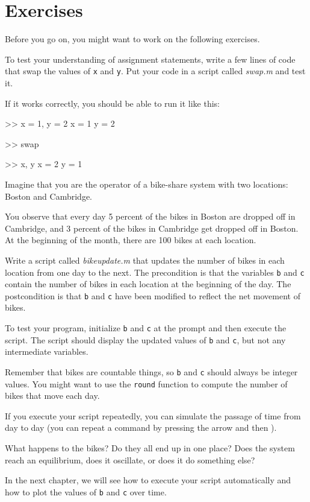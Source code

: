 \section{Exercises}

Before you go on, you might want to work on the following exercises.

\begin{ex}
To test your understanding of assignment statements, write a few lines of code that swap the values of \lstinline{x} and \lstinline{y}.
Put your code in a script called \emph{swap.m} and test it.

If it works correctly, you should be able to run it like this:

\begin{code}
>> x = 1, y = 2
x = 1
y = 2

>> swap

>> x, y
x = 2
y = 1
\end{code}
\end{ex}





\begin{ex}
\label{bikegame}

Imagine that you are the operator of a bike-share system with two
locations: Boston and Cambridge.

You observe that every day 5 percent
of the bikes in Boston are dropped off in Cambridge, and 3 percent of the bikes
in Cambridge get dropped off in Boston.
At the beginning of the month, there are 100 bikes at each location.

Write a script called \emph{bike\textunderscore update.m} that updates the number
of bikes in each location from one day to the next.  The precondition
is that the variables \lstinline{b} and \lstinline{c} contain the number of bikes
in each location at the beginning of the day.  The postcondition
is that \lstinline{b} and \lstinline{c} have been modified to reflect the net movement of bikes.

To test your program, initialize \lstinline{b} and \lstinline{c} at
the prompt and then execute the script.  The script should display
the updated values of \lstinline{b} and \lstinline{c}, but not any intermediate
variables.

Remember that bikes are countable things, so \lstinline{b} and \lstinline{c} should always be integer values.  You might want to use the \lstinline{round} function
to compute the number of bikes that move each day.

If you execute your script repeatedly, you can simulate the passage
of time from day to day (you can repeat a command by pressing the  arrow and then ).

What happens to the bikes?  Do they all end up in one place?  Does the system reach an equilibrium, does it oscillate, or does it do something else?

In the next chapter, we will see how to execute your script automatically
and how to plot the values of \lstinline{b} and \lstinline{c} over time.

\end{ex}
